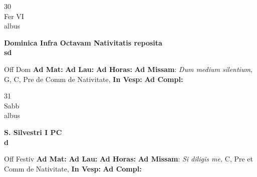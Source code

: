 \documentclass[10pt, openany]{book}
\begin{document}
        \begin{center}
            \begin{minipage}{3.5in}
                \vspace{2em}
                \begin{minipage}{0.5in}
                    {\Huge 30} \\
                    {\normalsize Fer VI} \\
                    {\normalsize albus}
                \end{minipage}
                \begin{minipage}{3.0in}
                    \textbf{ \large Dominica Infra Octavam Nativitatis reposita \\
                    \textnormal{\normalsize sd}} \\ 
                \end{minipage}
                \begin{justify}Off Dom
                    \textbf{Ad Mat: }
                    \textbf{Ad Lau: }
                    \textbf{Ad Horas: }\textbf{Ad Missam}: \textit{Dum medium silentium,} G, C, Pre de Comm de Nativitate,  
                    \textbf{In Vesp: }
                    \textbf{Ad Compl: }
                \end{justify}
            \end{minipage}
        \end{center}
    
        \begin{center}
            \begin{minipage}{3.5in}
                \vspace{2em}
                \begin{minipage}{0.5in}
                    {\Huge 31} \\
                    {\normalsize Sabb} \\
                    {\normalsize albus}
                \end{minipage}
                \begin{minipage}{3.0in}
                    \textbf{ \large S. Silvestri I PC \\
                    \textnormal{\normalsize d}} \\ 
                \end{minipage}
                \begin{justify}Off Festiv
                    \textbf{Ad Mat: }
                    \textbf{Ad Lau: }
                    \textbf{Ad Horas: }\textbf{Ad Missam}: \textit{Si diligis me,} C, Pre et Comm de Nativitate,  
                    \textbf{In Vesp: }
                    \textbf{Ad Compl: }
                \end{justify}
            \end{minipage}
        \end{center}
    
\end{document}
